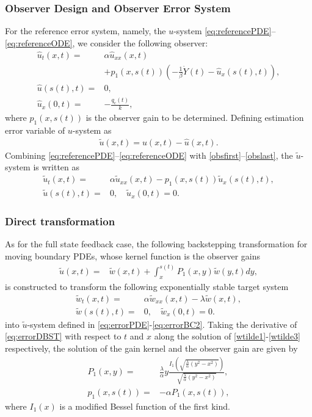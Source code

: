 \documentclass[journal]{IEEEtran}
\begin{document}
\subsubsection{Observer Design and Observer Error System} 

For the reference error  system, namely, the $u$-system  \eqref{eq:referencePDE}--\eqref{eq:referenceODE},  we  consider the following observer:
\begin{align}
\hat{u}_t(x,t)=&\alpha  \hat{u}_{xx}(x,t)\nonumber\\&+p_1(x,s(t))\left(-\frac{1}{\beta}\dot{Y}(t)-\hat{u}_x(s(t),t)\right), \label{obsfirst}\\
\hat{u}(s(t),t)=&0, \\
\label{obslast}\hat{u}_x(0,t)=&-\frac{q_{{\mathrm c}}(t)}{k}, 
\end{align}
where $p_1(x,s(t))$ is the observer gain to be determined. Defining estimation error variable of $u$-system as 
\begin{align}\label{estimateerror}
\tilde{u}(x,t)=u(x,t)-\hat{u}(x,t).
\end{align}
Combining \eqref{eq:referencePDE}--\eqref{eq:referenceODE} with \eqref{obsfirst}--\eqref{obslast},  the $\tilde{u}$-system is written as
\begin{align}\label {eq:errorPDE}
\tilde{u}_t(x,t)=& \alpha \tilde{u}_{xx}(x,t)-p_1(x,s(t))\tilde{u}_x(s(t),t),\\
\label{eq:errorBC2}\tilde{u}(s(t),t)=&0, \quad \tilde{u}_x(0,t)=0.
\end{align}

\subsubsection{Direct transformation}
As for the full state feedback case,   the following backstepping transformation for moving boundary PDEs, whose kernel function is the observer gains 
\begin{align}\label{eq:errorDBST}
\tilde{u}(x,t)=&\tilde{w}(x,t)+\int_x^{s(t)} P_{1}(x,y)\tilde{w}(y,t) dy,
\end{align}
is constructed  to transform the following exponentially stable target system 
\begin{align}\label{wtilde1}
\tilde{w}_t(x,t)=& \alpha \tilde{w}_{xx}(x,t)- \lambda \tilde{w}(x,t),\\
\tilde{w}(s(t),t)=&0, \quad \tilde{w}_x (0,t)=0.\label{wtilde3}
\end{align}
into $\tilde{u}$-system defined  in \eqref{eq:errorPDE}-\eqref{eq:errorBC2}. Taking the derivative of \eqref {eq:errorDBST} with respect to $t$ and $x$ along the solution of \eqref{wtilde1}-\eqref{wtilde3} respectively, the solution of the gain kernel and the observer gain are given by
\begin{align}
\label{p1gain}P_{1}(x,y) =& \frac{\lambda}{\alpha} y\frac{I_1\left(\sqrt{\frac{\lambda}{\alpha} (y^2-x^2)}\right)}{\sqrt{\frac{\lambda}{\alpha} (y^2-x^2)}}, \\
\label{p3gain}p_1(x,s(t))=&-\alpha P_{1}(x,s(t)), 
\end{align}
where $I_1(x)$ is a modified Bessel function of the first kind. 
\end{document}
